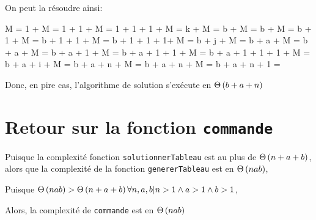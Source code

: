 \documentclass[class=article]{standalone}
\begin{document}
On peut la résoudre ainsi:
\begin{deriv}
    M
    \<= 
    1 + M
    \<= 
    1 + 1 + M
    \<= 
    1 + 1 + 1 + M
    \<= 
    k + M
    \<= 
    b + M
    \<= 
    b + M
    \<= 
    b + 1 + M
    \<= 
    b + 1 + 1 + M
    \<= 
    b + 1 + 1 + 1+ M
    \<= 
    b + j + M
    \<= 
    b + a + M
    \<= 
    b + a + M
    \<= 
    b + a + 1 + M
    \<= 
    b + a + 1  + 1 + M
    \<= 
    b + a + 1 + 1 + 1 + M
    \<= 
    b + a + i + M
    \<= 
    b + a + n + M
    \<= 
    b + a + n + M
    \<= 
    b + a + n + 1
    \<\in
    \Theta{}
    \<=
    \Theta{}
\end{deriv}


Donc, en pire cas, l'algorithme de solution s'exécute en $\Theta\left ( b + a + n \right )$

\section*{Retour sur la fonction \lstinline{commande}}

Puisque la complexité fonction \lstinline{solutionnerTableau} 
est au plus de $\Theta\left ( n + a + b \right )$, alors que la complexité 
de la fonction \lstinline{genererTableau} est en $\Theta\left ( nab \right )$,

Puisque $\Theta\left ( nab \right ) > \Theta\left ( n + a + b \right )
\forall n, a, b | n > 1 \wedge a > 1 \wedge b > 1$,

Alors, la complexité de \lstinline{commande} est en $\Theta\left ( nab \right )$
\end{document}
